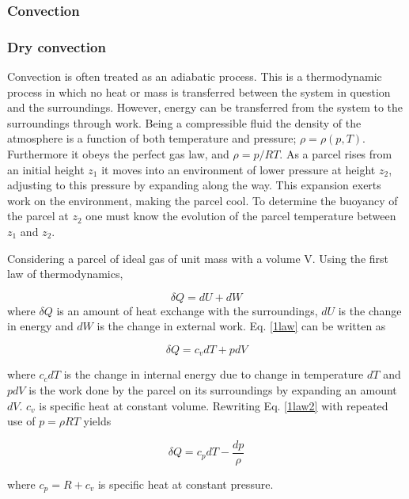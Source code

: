 \subsubsection{Convection}

\subsubsection{Dry convection}

Convection is often treated as an adiabatic process. This is a thermodynamic process in which no heat or mass is transferred between the system in question and the surroundings. However, energy can be transferred from the system to the surroundings through work. Being a compressible fluid the density of the atmosphere is a function of both temperature and pressure; $\rho = \rho(p,T)$. Furthermore it obeys the perfect gas law, and $\rho = p/RT$. As a parcel rises from an initial height $z_1$ it moves into an environment of lower pressure at height $z_2$, adjusting to this pressure by expanding along the way. This expansion exerts work on the environment, making the parcel cool. To determine the buoyancy of the parcel at $z_2$ one must know the evolution of the parcel temperature between $z_1$ and $z_2$.

Considering a parcel of ideal gas of unit mass with a volume V. Using the first law of thermodynamics,

\begin{equation}
    \delta Q = dU + dW
    \label{1law}
\end{equation}
where $\delta Q$ is an amount of heat exchange with the surroundings, $dU$ is the change in energy and $dW$ is the change in external work. Eq. \eqref{1law} can be written as 

\begin{equation}
    \delta Q = c_vdT + pdV
    \label{1law2}
\end{equation}

where $c_cdT$ is the change in internal energy due to change in temperature $dT$ and $pdV$ is the work done by the parcel on its surroundings by expanding an amount $dV$. $c_v$ is specific heat at constant volume. Rewriting Eq. \eqref{1law2} with repeated use of $p=\rho RT$ yields 

\begin{equation}
    \delta Q = c_pdT - \frac{dp}{\rho}
    \label{thermo1}
\end{equation}

where $c_p = R + c_v$ is specific heat at constant pressure. 

